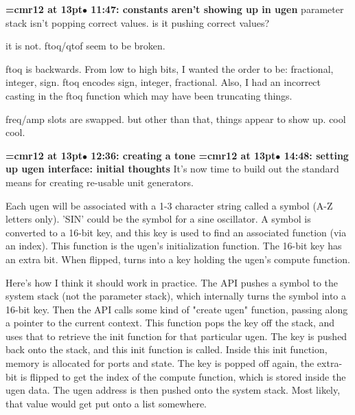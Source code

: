 {\smallskip\noindent\bf\font\titlefont=cmr12 at 13pt\titlefont $\bullet$ 11:47: constants aren't showing up in ugen}\smallskip
parameter stack isn't popping correct values. is it pushing correct values?
\par

it is not. ftoq/qtof seem to be broken.
\par

ftoq is backwards. From low to high bits, I wanted the order to be: fractional, integer, sign. ftoq encodes sign, integer, fractional. Also, I had an incorrect casting in the ftoq function which may have been truncating things.
\par

freq/amp slots are swapped. but other than that, things appear to show up. cool cool.
\par

{\smallskip\noindent\bf\font\titlefont=cmr12 at 13pt\titlefont $\bullet$ 12:36: creating a tone}\smallskip
{\smallskip\noindent\bf\font\titlefont=cmr12 at 13pt\titlefont $\bullet$ 14:48: setting up ugen interface: initial thoughts}\smallskip
It's now time to build out the standard means for creating re-usable unit generators.
\par

Each ugen will be associated with a 1-3 character string called a symbol (A-Z letters only). 'SIN' could be the symbol for a sine oscillator. A symbol is converted to a 16-bit key, and this key is used to find an associated function (via an index). This function is the ugen's initialization function. The 16-bit key has an extra bit. When flipped, turns into a key holding the ugen's compute function.
\par

Here's how I think it should work in practice. The API pushes a symbol to the system stack (not the parameter stack), which internally turns the symbol into a 16-bit key. Then the API calls some kind of "create ugen" function, passing along a pointer to the current context. This function pops the key off the stack, and uses that to retrieve the init function for that particular ugen. The key is pushed back onto the stack, and this init function is called. Inside this init function, memory is allocated for ports and state. The key is popped off again, the extra-bit is flipped to get the index of the compute function, which is stored inside the ugen data. The ugen address is then pushed onto the system stack. Most likely, that value would get put onto a list somewhere.
\par

